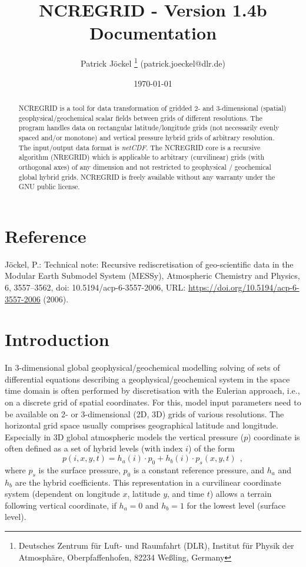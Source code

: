 \documentclass[12pt, a4paper]{article}
\title{NCREGRID - Version 1.4b\\ Documentation}
\author{Patrick J\"{o}ckel
  \footnote{Deutsches Zentrum f\"ur Luft- und Raumfahrt (DLR),
    Institut f\"ur Physik der Atmosph\"are, Oberpfaffenhofen,
    82234 We{\ss}ling, Germany}
(patrick.joeckel@dlr.de)}
\date{\today}
\begin{document}
%
\maketitle
%
\begin{abstract}
NCREGRID is a tool for data transformation of gridded 2- and
3-di\-men\-sio\-nal (spatial) geophysical/geochemical scalar fields
between grids of different resolutions.
The program handles data on rectangular latitude/longitude grids
(not necessarily evenly spaced and/or monotone)
and vertical pressure hybrid grids of arbitrary resolution.
The input/output data format is {\it netCDF}.
The NCREGRID core is a recursive algorithm (NREGRID) which is applicable
to arbitrary (curvilinear) grids (with orthogonal axes) of any dimension
and not restricted to geo\-phy\-si\-cal / geo\-chemi\-cal global hybrid grids.
NCREGRID is freely available without any warranty under the GNU public license.
\end{abstract}

\section*{Reference}
J\"ockel, P.: Technical note: Recursive rediscretisation of geo-scientific data
in the Modular Earth Submodel System (MESSy), Atmospheric Chemistry and
Physics, 6, 3557–3562, doi: 10.5194/acp-6-3557-2006, URL:
\url{https://doi.org/10.5194/acp-6-3557-2006} (2006).

\clearpage
\tableofcontents
\clearpage


\section{Introduction}
\label{sec:intro}
In 3-dimensional global geophysical/geochemical modelling 
solving of sets of differential equations describing a
geophysical/geochemical system in the space time domain is often performed
by discretisation with the Eulerian approach, i.e., on a discrete
grid of spatial coordinates.
For this, model input parameters need to be available on 2- or
3-dimensional (2D, 3D) grids of various resolutions.
The horizontal grid space usually comprises geographical latitude and
longitude. Especially in 3D global atmospheric models 
the vertical pressure ($p$) coordinate
is often defined as a set of hybrid levels (with index $i$) of the form
\begin{equation}
 \label{e:hybrid}
    p(i,x,y,t) = h_a(i) \cdot p_0 + h_b(i) \cdot p_s(x,y,t)~~,
\end{equation}
where $p_s$ is the surface pressure, $p_0$ is a constant reference pressure,
and $h_a$ and $h_b$ are the hybrid coefficients. This representation in a
curvilinear coordinate system
(dependent on longitude $x$, latitude $y$, and time $t$)
allows a terrain following vertical coordinate, if $h_a = 0$ and
$h_b = 1$ for the lowest level (surface level).
\end{document}
